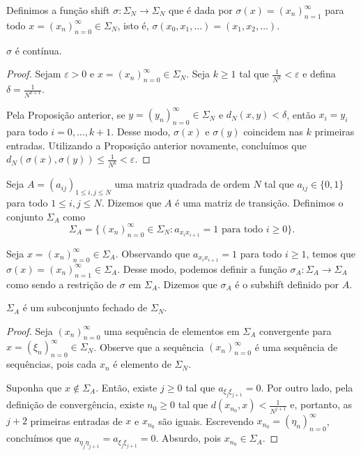 Definimos a função shift $\sigma: \Sigma_N \to \Sigma_N$ que é dada por $\sigma(x) = (x_n)_{n=1}^\infty$ para todo $x = (x_n)_{n=0}^\infty \in \Sigma_N$, isto é, $\sigma(x_0, x_1, \dots) = (x_1, x_2, \dots)$.

\begin{proposition}
$\sigma$ é contínua.
\end{proposition}

\begin{proof}
Sejam $\varepsilon > 0$ e $x = (x_n)_{n=0}^\infty \in \Sigma_N$. Seja $k \geq 1$ tal que $\frac{1}{N^k} < \varepsilon$ e defina $\delta = \frac{1}{N^{k+1}}$.

Pela Proposição anterior, se $y = (y_n)_{n=0}^\infty \in \Sigma_N$ e $d_N(x, y) < \delta$, então $x_i = y_i$ para todo $i = 0, \dots, k+1$. Desse modo, $\sigma(x)$ e $\sigma(y)$ coincidem nas $k$ primeiras entradas. Utilizando a Proposição anterior novamente, concluímos que $d_N(\sigma(x), \sigma(y)) \leq \frac{1}{N^k} < \varepsilon$.
\end{proof}


Seja $A = (a_{ij})_{1 \leq i,j \leq N}$ uma matriz quadrada de ordem $N$ tal que $a_{ij} \in \{ 0, 1 \}$ para todo $1 \leq i,j \leq N$. Dizemos que $A$ é uma matriz de transição. Definimos o conjunto $\Sigma_A$ como
$$\Sigma_A = \{ (x_n)_{n=0}^{\infty} \in \Sigma_N : a_{x_i x_{i+1}} = 1 \textrm{ para todo } i \geq 0 \}.$$

Seja $x = (x_n)_{n=0}^{\infty} \in \Sigma_A$. Observando que $a_{x_i x_{i+1}} = 1$ para todo $i \geq 1$, temos que $\sigma(x) = (x_n)_{n=1}^\infty \in \Sigma_A$. Desse modo, podemos definir a função $\sigma_A: \Sigma_A \to \Sigma_A$ como sendo a restrição de $\sigma$ em $\Sigma_A$. Dizemos que $\sigma_A$ é o subshift definido por $A$.

\begin{proposition}
$\Sigma_A$ é um subconjunto fechado de $\Sigma_N$.
\end{proposition}


\begin{proof}
Seja $(x_n)_{n=0}^{\infty}$ uma sequência de elementos em $\Sigma_A$ convergente para $x = (\xi_n)_{n=0}^{\infty} \in \Sigma_N$. Observe que a sequência $(x_n)_{n=0}^{\infty}$ é uma sequência de sequências, pois cada $x_n$ é elemento de $\Sigma_N$.

Suponha que $x \notin \Sigma_A$. Então, existe $j \geq 0$ tal que $a_{\xi_j \xi_{j+1}} = 0$. Por outro lado, pela definição de convergência, existe $n_0 \geq 0$ tal que $d(x_{n_0}, x) < \frac{1}{N^{j+1}}$ e, portanto, as $j+2$ primeiras entradas de $x$ e $x_{n_0}$ são iguais. Escrevendo $x_{n_0} = (\eta_n)_{n=0}^\infty$, concluímos que $a_{\eta_j \eta_{j+1}} = a_{\xi_j \xi_{j+1}} = 0$. Absurdo, pois $x_{n_0} \in \Sigma_A$.
\end{proof}


